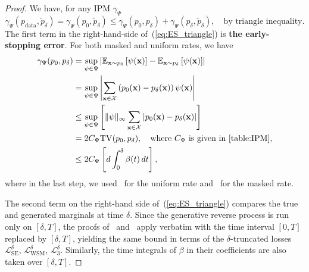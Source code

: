 \documentclass{article} %
\def\eqref#1{equation~\ref{#1}}
\newcommand{\bfx}{{\bf x}}
\newcommand{\TV}{\mathrm{TV}}
\newcommand{\LWSM}{\mathcal{L}_{\mathrm{WSM}}}
\newcommand{\LSE}{\mathcal{L}_{\mathrm{SE}}}
\renewcommand{\eqref}[1]{\textup{(\ref{#1})}}
\newcommand{\LThree}{\mathcal{L}_{3}}
\begin{document}
\begin{proof}
    We have, for any IPM $\gamma_{\Psi}$
    \begin{equation}\label{eq:ES_triangle}
        \gamma_\Psi(p_\mathrm{data}, \tilde{p}_\delta) = \gamma_\Psi(p_0, \tilde{p}_\delta) \leq \gamma_\Psi(p_0, {p}_\delta) + \gamma_\Psi(p_\delta, \tilde{p}_\delta),\quad \text{by triangle inequality.}
    \end{equation}
    The first term in the right-hand-side of~\eqref{eq:ES_triangle} is \textbf{the early-stopping error}. For both masked and uniform rates, we have
    \begin{align*}
        \gamma_\Psi(p_0, {p}_\delta) &= \sup_{\psi \in \Psi} \left| \mathbb{E}_{\bfx \sim p_0} \left[ \psi(\bfx)\right] - \mathbb{E}_{\bfx \sim p_\delta} \left[ \psi(\bfx)\right] \right| \\
        &= \sup_{\psi \in \Psi} \left| \sum_{\bfx \in \mathcal{X}} \left( p_0(\bfx) - p_\delta(\bfx) \right) \psi(\bfx) \right| \\
        &\leq \sup_{\psi \in \Psi} \left[ \|\psi\|_\infty \sum_{\bfx \in \mathcal{X}} \left| p_0(\bfx) - p_\delta(\bfx) \right| \right] \\
        &= 2 C_\Psi \TV(p_0, p_\delta), \quad \text{where $C_\Psi$ is given in~\Cref{table:IPM},} \\
        &\leq 2 C_\Psi \left[ d\int_0^\delta \beta(t)\,dt \right],
    \end{align*}
    where in the last step, we used~ for the uniform rate and~ for the masked rate.

    The second term on the right-hand side of~\eqref{eq:ES_triangle} compares the true and generated marginals at time $\delta$. Since the generative reverse process is run only on $[\delta, T]$, the proofs of~ and~ apply verbatim with the time interval $[0,T]$ replaced by $[\delta,T]$, yielding the same bound in terms of the $\delta$-truncated losses $\LSE^\delta$, $\LWSM^\delta$, $\LThree^\delta$. Similarly, the time integrals of $\beta$ in their coefficients are also taken over $[\delta,T]$.
    

\end{proof}
\end{document}
